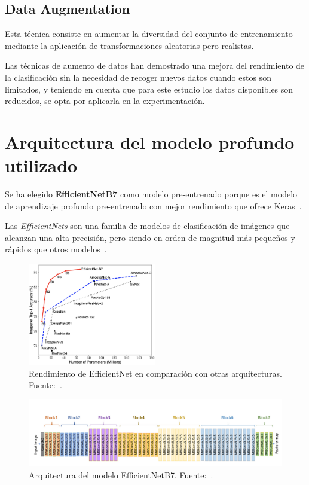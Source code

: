 \subsection{Data Augmentation}\label{subsec:data-augmentation}
Esta técnica consiste en aumentar la diversidad del conjunto de entrenamiento mediante la aplicación de transformaciones
aleatorias pero realistas.

Las técnicas de aumento de datos han demostrado una mejora del rendimiento de la clasificación sin la necesidad de
recoger nuevos datos cuando estos son limitados, y teniendo en cuenta que para este estudio los datos disponibles son
reducidos, se opta por aplicarla en la experimentación.

\section{Arquitectura del modelo profundo utilizado}\label{sec:arquitectura-del-modelo-profundo-utilizado}
Se ha elegido \textbf{EfficientNetB7} como modelo pre-entrenado porque es el modelo de aprendizaje profundo pre-entrenado
con mejor rendimiento que ofrece Keras~\cite{keras-applications}.

Las \textit{EfficientNets} son una familia de modelos de clasificación de imágenes que alcanzan una alta precisión,
pero siendo en orden de magnitud más pequeños y rápidos que otros modelos~\cite{efficientnets}.

\begin{figure}[H]
    \centering
    \includegraphics[width=0.5\textwidth]{./imgs/redimiento-efficientnet}
    \caption{Rendimiento de EfficientNet en comparación con otras arquitecturas. Fuente:~\cite{efficientnets-models}. }
    \label{fig:redimiento-efficientnet}
\end{figure}

\begin{figure}[H]
    \centering
    \includegraphics[width=\textwidth]{./imgs/efficientnetb7-model-architecture}
    \caption{Arquitectura del modelo EfficientNetB7. Fuente:~\cite{efficientnetb7-model-architecture}. }
    \label{fig:efficientnetb7-model-architecture}
\end{figure}

